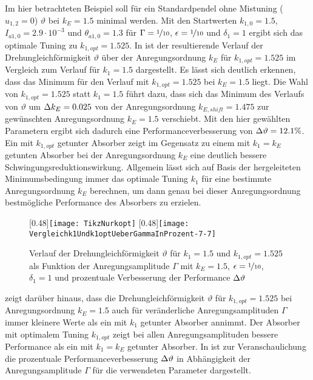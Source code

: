 %
%
%
Im hier betrachteten Beispiel soll für ein Standardpendel ohne Mistuning ($u_{1,2}=0$) $\vartheta$ bei $k_E=1.5$ minimal werden. 
Mit den Startwerten $k_{1,0}=1.5$, $I_{a1,0}=2.9 \cdot 10^{-3}$ und $\theta_{a1,0}= 1.3$ für 
$\Gamma = \nicefrac{1}{10}$,  $\epsilon = \nicefrac{1}{10}$ und  $\delta_1 = 1$ ergibt sich das optimale Tuning zu $k_{1,opt} = 1.525$. In   ist
der resultierende Verlauf der Drehungleichförmigkeit $\vartheta$ über der Anregungsordnung $k_E$ für $k_{1,opt} = 1.525$ im
Vergleich zum Verlauf für $k_1 =1.5$  dargestellt. 
Es lässt sich deutlich erkennen, dass das Minimum für den Verlauf mit $k_{1,opt} = 1.525$ 
 bei $k_E = 1.5$ liegt. 
%
Die Wahl von $k_{1,opt}=1.525$ statt $k_1=1.5$ führt dazu, dass sich das Minimum des Verlaufs von $\vartheta$ um
$\Delta k_E=0.025$ von der Anregungsordnung $k_{E,shift} = 1.475$ zur gewünschten Anregungsordnung $k_E=1.5$ verschiebt.
Mit den hier gewählten Parametern ergibt sich dadurch eine Performanceverbesserung 
von $\Delta \vartheta = 12.1\%$.
%
Ein mit $k_{1,opt}$ getunter Absorber zeigt  im Gegensatz zu einem mit $k_1 = k_E$ getunten Absorber 
bei der Anregungsordnung $k_E$ eine deutlich bessere Schwingungsreduktionswirkung. 
Allgemein lässt sich auf Basis der hergeleiteten Minimumsbedingung 
immer das optimale Tuning $k_1$ für eine bestimmte Anregungsordnung $k_E$ berechnen,
um dann genau bei dieser Anregungsordnung bestmögliche Performance des Absorbers zu erzielen. 	

%
%
%
%
%
\begin{figure}[ht]%
	\centering
	[0.48\textwidth]{\texttt{[image: TikzNurkopt]}}
	\hfill
	[0.48\textwidth]{\texttt{[image: Vergleichk1Undk1optUeberGammaInProzent-7-7]}}
	
	\caption[Verlauf der Drehungleichförmigkeit als Funktion der Anregungsamplitude]{Verlauf der Drehungleichförmigkeit $\vartheta$ für $k_1=1.5$ und $k_{1,opt} = 1.525$ 
				als Funktion der Anregungsamplitude $\Gamma$ mit $k_E = 1.5$,  $\epsilon = \nicefrac{1}{10}$,  $\delta_1 = 1$
				und prozentuale Verbesserung der Performance $\Delta \vartheta$}
	\label{fig:Opt:Beispiel:Optimalesk1UeberGamma}
\end{figure}
%
%
%
%
%
%
%
 zeigt darüber hinaus, dass die Drehungleichförmigkeit $\vartheta$ für $k_{1,opt} = 1.525$ bei Anregungsordnung $k_E=1.5$ auch
für veränderliche Anregungsamplituden  $\Gamma$  immer kleinere Werte als ein mit $k_1$ getunter Absorber annimmt. 
Der Absorber mit optimalem Tuning $k_{1,opt}$ zeigt bei allen Anregungsamplituden 
bessere Performance als ein mit $k_1=k_E$ getunter Absorber.
In  ist zur Veranschaulichung
die prozentuale Performanceverbesserung $\Delta \vartheta$ in Abhängigkeit der
Anregungsamplitude  $\Gamma$ für die verwendeten Parameter dargestellt.


